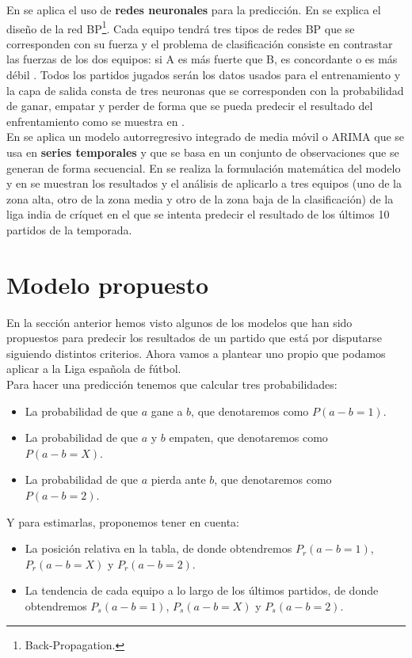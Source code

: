 En \cite{refpred2} se aplica el uso de \textbf{redes neuronales} para la predicción. En \cite[Section 2.1.]{refpred2} se explica el diseño de la red BP\footnote{Back-Propagation.}. Cada equipo tendrá tres tipos de redes BP que se corresponden con su fuerza y el problema de clasificación consiste en contrastar las fuerzas de los dos equipos: si A es más fuerte que B, es concordante o es más débil \cite[Section 2.2.]{refpred2}. Todos los partidos jugados serán los datos usados para el entrenamiento \cite[Section 3.1.]{refpred2} y la capa de salida consta de tres neuronas que se corresponden con la probabilidad de ganar, empatar y perder \cite[Section 3.2.]{refpred2} de forma que se pueda predecir el resultado del enfrentamiento como se muestra en \cite[Section 3.4.]{refpred2}.\\

En \cite{refpred3} se aplica un modelo autorregresivo integrado de media móvil o ARIMA que se usa en \textbf{series temporales} y que se basa en un conjunto de observaciones que se generan de forma secuencial. En \cite[Section E]{refpred3} se realiza la formulación matemática del modelo y en \cite[Section F]{refpred3} se muestran los resultados y el análisis de aplicarlo a tres equipos (uno de la zona alta, otro de la zona media y otro de la zona baja de la clasificación) de la liga india de críquet en el que se intenta predecir el resultado de los últimos 10 partidos de la temporada.\\

\section{Modelo propuesto}
En la sección anterior hemos visto algunos de los modelos que han sido propuestos para predecir los resultados de un partido que está por disputarse siguiendo distintos criterios. Ahora vamos a plantear uno propio que podamos aplicar a la Liga española de fútbol.\\

Para hacer una predicción tenemos que calcular tres probabilidades:
\begin{itemize}
	\item La probabilidad de que $a$ gane a $b$, que denotaremos como $P(a-b=1)$.
	\item La probabilidad de que $a$ y $b$ empaten, que denotaremos como $P(a-b=X)$.
	\item La probabilidad de que $a$ pierda ante $b$, que denotaremos como $P(a-b=2)$.
\end{itemize}
Y para estimarlas, proponemos tener en cuenta:
\begin{itemize}
	\item La posición relativa en la tabla, de donde obtendremos $P_{r}(a-b=1)$, $P_{r}(a-b=X)$ y $P_{r}(a-b=2)$.
	\item La tendencia de cada equipo a lo largo de los últimos partidos, de donde obtendremos $P_{s}(a-b=1)$, $P_{s}(a-b=X)$ y $P_{s}(a-b=2)$.
\end{itemize}

